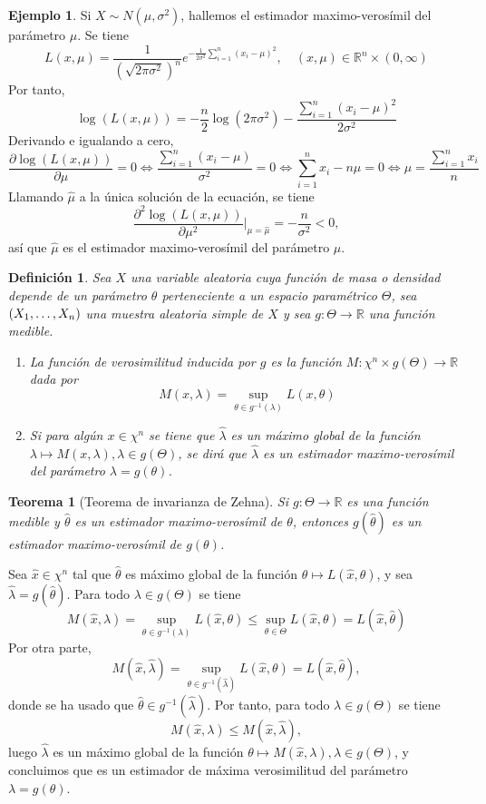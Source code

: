 \documentclass[11pt]{report}
\makeatletter
\renewenvironment{proof}[1][\proofname]{\par
  \pushQED{\qed}%
  \normalfont \topsep\z@skip %
  \trivlist
  \item[\hskip\labelsep
        \itshape
    #1\@addpunct{.}]\ignorespaces
}{%
  \popQED\endtrivlist\@endpefalse
}
\newtheorem{theorem}{Teorema}
\newtheorem{definition}{Definición}
\theoremstyle{definition}
\newtheorem{example}{Ejemplo}
\newcommand{\R}{\mathbb R}
\makeatother
\begin{document}
\begin{example}
Si $X \sim N(\mu,\sigma^2)$, hallemos el estimador maximo-verosímil del parámetro $\mu$. Se tiene 
\[L(x,\mu) = \frac{1}{\left(\sqrt{2\pi\sigma^2}\right)^n}e^{-\frac{1}{2\sigma^2}\sum_{i=1}^n (x_i-\mu)^2}, \quad (x,\mu) \in \R^n\times (0,\infty) \]
Por tanto,
\[\log(L(x,\mu)) =-\frac{n}{2}\log(2\pi\sigma^2) -\frac{\sum_{i=1}^n(x_i-\mu)^2}{2\sigma^2}\]
Derivando e igualando a cero,
\[\frac{\partial \log(L(x,\mu))}{\partial \mu} = 0 \iff \frac{\sum_{i=1}^n (x_i-\mu)}{\sigma^2} = 0 \iff \sum_{i=1}^n x_i-n\mu = 0 \iff \mu = \frac{\sum_{i=1}^nx_i}{n}\]
Llamando $\hat{\mu}$ a la única solución de la ecuación, se tiene
\[\frac{\partial^2 \log(L(x,\mu))}{\partial \mu^2} \Bigg|_{\mu=\hat{\mu}} = -\frac{n}{\sigma^2} < 0,\]
así que $\hat{\mu}$ es el estimador maximo-verosímil del parámetro $\mu$.

\begin{definition}
Sea $X$ una variable aleatoria cuya función de masa o densidad depende de un parámetro $\theta$ perteneciente a un espacio paramétrico $\Theta$, sea $(X_1,\mathellipsis,X_n)$ una muestra aleatoria simple de $X$ y sea $g \colon \Theta \to \R$ una función medible.
\begin{enumerate}
    \item La \emph{función de verosimilitud inducida por $g$} es la función $M \colon \chi^n \times g(\Theta) \to \R$ dada por
\[M(x,\lambda) = \sup_{\theta \in g^{-1}(\lambda)}L(x,\theta)\]
\item Si para algún $x \in \chi^n$ se tiene que $\hat{\lambda}$ es un máximo global de la función $\lambda \mapsto M(x,\lambda), \lambda \in g(\Theta)$, se dirá que $\hat{\lambda}$ es un \emph{estimador maximo-verosímil del parámetro $\lambda = g(\theta)$}.
\end{enumerate}
\end{definition}

\begin{theorem}[Teorema de invarianza de Zehna]
Si $g \colon \Theta \to \R$ es una función medible y $\hat{\theta}$ es un estimador maximo-verosímil de $\theta$, entonces $g(\hat{\theta})$ es un estimador maximo-verosímil de $g(\theta)$.
\end{theorem}

\begin{proof}
Sea $\hat{x} \in \chi^n$ tal que $\hat{\theta}$ es máximo global de la función $\theta \mapsto L(\hat{x},\theta)$, y sea $\hat{\lambda} = g(\hat{\theta})$. Para todo $\lambda \in g(\Theta)$ se tiene
\[M(\hat{x},\lambda) = \sup_{\theta \in g^{-1}(\lambda)}L(\hat{x},\theta) \leq \sup_{\theta \in \Theta} L(\hat{x},\theta) = L(\hat{x},\hat{\theta}) \]
Por otra parte,
\[M(\hat{x},\hat{\lambda}) = \sup_{\theta \in g^{-1}(\hat{\lambda})} L(\hat{x},\theta) = L(\hat{x},\hat{\theta}),\]
donde se ha usado que $\hat{\theta} \in g^{-1}(\hat{\lambda})$. Por tanto, para todo $\lambda \in g(\Theta)$ se tiene
\[M(\hat{x},\lambda) \leq M(\hat{x},\hat{\lambda}),\]
luego $\hat{\lambda}$ es un máximo global de la función $ \theta \mapsto M(\hat{x},\lambda),\lambda \in g(\Theta)$, y concluimos que es un estimador de máxima verosimilitud del parámetro $\lambda = g(\theta)$.
\end{proof}


\end{example}
\end{document}
